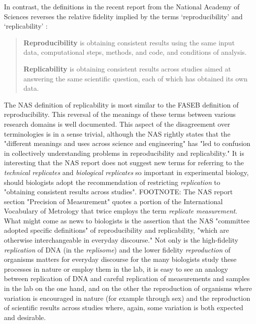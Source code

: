         In contrast, the definitions in the recent report from the National Academy of Sciences reverses the relative fidelity implied by the terms `reproducibility' and `replicability' \cite[p.4]{committeeonreproducibilityandreplicabilityinscience2019reproducibility}: \begin{quote}
	\textbf{Reproducibility} is obtaining consistent results using the same input data, computational
	steps, methods, and code, and conditions of analysis.  \medskip

	\textbf{Replicability} is obtaining consistent results across studies aimed at answering the same
	scientific question, each of which has obtained its own data.
\end{quote}
      
The NAS definition of replicability is most similar to the FASEB definition of reproducibility.
This reversal of the meanings of these terms between various research domains is well documented.
This aspect of the disagreement over terminologies is in a sense trivial, although the NAS rightly 
	states that the "different meanings and uses across science and engineering" has "led to confusion in collectively 
	understanding problems in reproducibility and replicability."
It is interesting that the NAS report does not suggest new terms for referring to the \emph{technical replicates} 
	and  \emph{biological replicates} so important in experimental biology, should biologists adopt the recommendation 
	of restricting \emph{replication} to "obtaining consistent results across studies".
FOOTNOTE: The NAS report section "Precision of Measurement" quotes a portion of the International Vocabulary of
	Metrology that twice employs the term \emph{replicate measurement}.
What might come as news to biologists is the assertion that the NAS "committee adopted specific definitions" of 
	reproducibility and replicability, "which are otherwise interchangeable in everyday discourse."
Not only is the high-fidelity \emph{replication} of DNA (in the \emph{replisome}) and the lower fidelity \emph{reproduction}
	of organisms  matters for everyday discourse for the many biologists study these processes in nature or employ them in the lab,
	it is easy to see an analogy between replication of DNA and careful replication of measurements and samples
	in the lab on the one hand, and on the other the reproduction of organisms where variation is encouraged in nature
	(for example through sex) and the reproduction of scientific results across studies where, again, some variation is both 
	expected and desirable.

